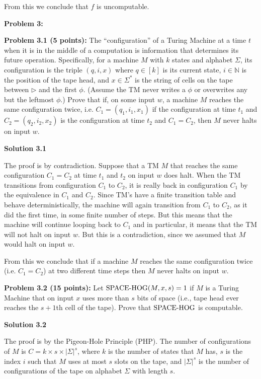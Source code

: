 \documentclass[11pt]{article}
\begin{document}
From this we conclude that $f$ is uncomputable.

\pagebreak


\textbf{Problem 3:}

\textbf{Problem 3.1 (5 points):} The ``configuration'' of a Turing Machine at a time $t$ when it is in the middle of a computation is information that determines its future operation. Specifically, for a machine $M$ with $k$ states and alphabet $\Sigma$, its configuration is the triple $(q,i,x)$ where $q \in [k]$ is its current state,  $i \in \mathbb{N}$ is the position of the tape head, and $x \in \Sigma^*$ is the string of cells on the tape between $\triangleright$ and the first $\phi$. (Assume the TM never writes a $\phi$ or overwrites any but the leftmost $\phi$.) Prove that if, on some input $w$, a machine $M$ reaches the same configuration twice, i.e. $C_1 = (q_1,i_1,x_1)$ if the configuration at time $t_1$ and $C_2 = (q_2,i_2,x_2)$ is the configuration at time $t_2$ and $C_1 = C_2$, then $M$ never halts on input $w$.

\textbf{Solution 3.1}

The proof is by contradiction. Suppose that a TM $M$ that reaches the same configuration $C_1 = C_2$ at time $t_1$ and $t_2$ on input $w$ does halt. When the TM transitions from configuration $C_1$ to $C_2$, it is really back in configuration $C_1$ by the equivalence in $C_1$ and $C_2$. Since TM's have a finite transition table and behave deterministically, the machine will again transition from $C_1$ to $C_2$, as it did the first time, in some finite number of steps. But this means that the machine will continue looping back to $C_1$ and in particular, it means that the TM will not halt on input $w$. But this is a contradiction, since we assumed that $M$ would halt on input $w$.

From this we conclude that if a machine $M$ reaches the same configuration twice (i.e. $C_1 = C_2$) at two different time steps then $M$ never halts on input $w$.

\newpage

\textbf{Problem 3.2 (15 points):} Let $\textrm{SPACE-HOG}(M,x,s) = 1$ if $M$ is a Turing Machine that on input $x$ uses more than $s$ bits of space (i.e., tape head ever reaches the $s+1$th cell of the tape). 
Prove that $\textrm{SPACE-HOG}$ is computable.

\textbf{Solution 3.2}

The proof is by the Pigeon-Hole Principle (PHP). The number of configurations of $M$ is $C = k \times s \times |\Sigma|^s$, where $k$ is the number of states that $M$ has, $s$ is the index $i$ such that $M$ uses at most $s$ slots on the tape, and $|\Sigma|^s$ is the number of configurations of the tape on alphabet $\Sigma$ with length $s$.
\end{document}
